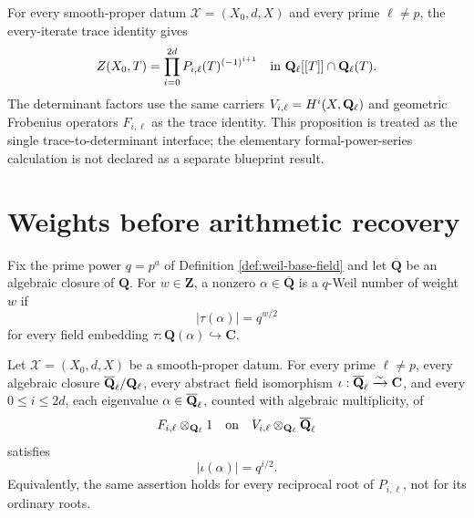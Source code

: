 

\begin{proposition}
\label{prop:trace-determinant}


For every smooth-proper datum \(\mathscr X=(X_0,d,X)\) and every prime
\(\ell\neq p\), the every-iterate trace identity gives
\[
 Z(X_0,T)=
 \prod_{i=0}^{2d}P_{i,\ell}(T)^{(-1)^{i+1}}
 \quad\text{in }\mathbf Q_{\ell}[[T]]\cap\mathbf Q_{\ell}(T).
\]
The determinant factors use the same carriers
\(V_{i,\ell}=H^i(X,\mathbf Q_{\ell})\) and geometric Frobenius operators
\(F_{i,\ell}\) as the trace identity.  This proposition is treated as the
single trace-to-determinant interface; the elementary formal-power-series
calculation is not declared as a separate blueprint result.
\end{proposition}


\section{Weights before arithmetic recovery}

\begin{definition}
\label{def:weil-numbers}


Fix the prime power \(q=p^a\) of Definition
\ref{def:weil-base-field} and let \(\overline{\mathbf Q}\) be an algebraic
closure of \(\mathbf Q\).  For \(w\in\mathbf Z\), a nonzero
\(\alpha\in\overline{\mathbf Q}\) is a \(q\)-Weil number of weight
\(w\) if
\[
 |\tau(\alpha)|=q^{w/2}
\]
for every field embedding
\(\tau:\mathbf Q(\alpha)\hookrightarrow\mathbf C\).
\end{definition}


\begin{proposition}
\label{prop:weight-purity}


Let \(\mathscr X=(X_0,d,X)\) be a smooth-proper datum.  For every prime
\(\ell\neq p\), every algebraic closure \(\overline{\mathbf Q}_\ell/\mathbf Q_{\ell}\), every abstract field
isomorphism \(\iota:\overline{\mathbf Q}_\ell\xrightarrow{\sim}\mathbf C\), and every
\(0\leq i\leq2d\), each eigenvalue \(\alpha\in\overline{\mathbf Q}_\ell\), counted with
algebraic multiplicity, of
\[
 F_{i,\ell}\otimes_{\mathbf Q_{\ell}}1
 \quad\text{on}\quad V_{i,\ell}\otimes_{\mathbf Q_{\ell}}\overline{\mathbf Q}_\ell
\]
satisfies
\[
 |\iota(\alpha)|=q^{i/2}.
\]
Equivalently, the same assertion holds for every reciprocal root of
\(P_{i,\ell}\), not for its ordinary roots.
\end{proposition}


